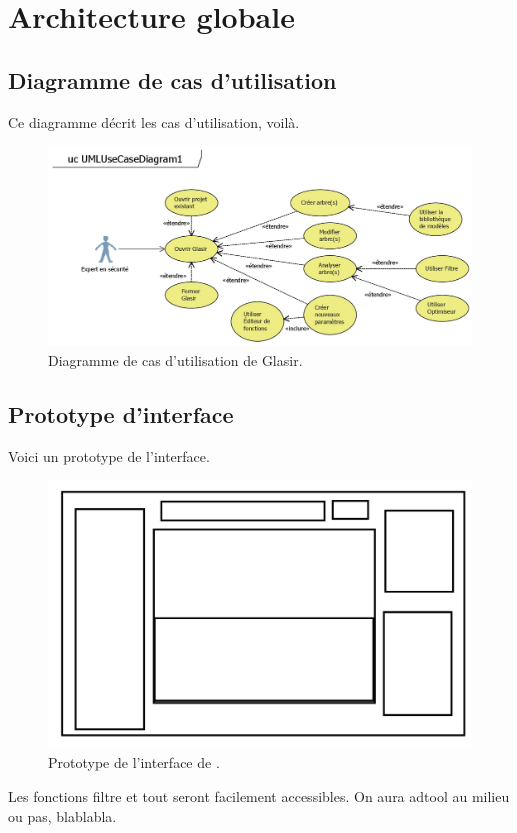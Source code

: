 \section{Architecture globale}
    \label{sec:archiGlobale}
    
	    
    \subsection{Diagramme de cas d'utilisation}
    \label{sec:casutil}
    	Ce diagramme décrit les cas d'utilisation, voilà.

    \begin{figure}[H]
        \centering
        \includegraphics[height=0.5\textwidth]{figure/UseCaseDiagram.png}
        \caption{Diagramme de cas d'utilisation de Glasir.}
        \label{fig:use_case}
    \end{figure}
        
    
    \subsection{Prototype d'interface}
    \label{sec:interface}
    
    Voici un prototype de l'interface.
    \begin{figure}[h!]
        \centering
        \includegraphics[height=0.4\textwidth]{figure/interface.png}
        \caption{Prototype de l'interface de \glasir{}.}
        \label{fig:glasir}
    \end{figure}
    
    Les fonctions filtre et tout seront facilement accessibles. On aura adtool au milieu ou pas, blablabla.
